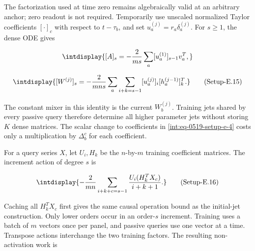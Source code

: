 
The factorization used at time zero remains algebraically valid at an arbitrary anchor; zero readout is not required. Temporarily use unscaled normalized Taylor coefficients \([\cdot]_c\) with respect to \(t-\tau_b\), and set \(u_a^{(j)}=r_a\delta_a^{(j)}\). For \(s\ge1\), the dense ODE gives


\begingroup\renewcommand{\theHequation}{intdisplay.1017}
\begin{equation*}
\intdisplay{
[A]_s=-\frac2{ms}\sum_a[u_a^{(1)}]_{s-1}v_a^T,
}
\end{equation*}
\endgroup

\label{int:eq-setup-e-15}
\begingroup\renewcommand{\theHequation}{intdisplay.1018}
\begin{equation}
\intdisplay{
[W^{(j)}]_s=-\frac2{mns}\sum_a\sum_{i+k=s-1}
              [u_a^{(j)}]_i[h_a^{(j-1)}]_k^T.
}
\tag{Setup-E.15}
\label{int:eq-0530-setup-e-15}
\end{equation}
\endgroup


The constant mixer in this identity is the current \(W_b^{(j)}\). Training jets shared by every passive query therefore determine all higher parameter jets without storing \(K\) dense matrices. The scalar change to coefficients in \hyperref[int:eq-setup-e-4]{\eqref{int:eq-0519-setup-e-4}} costs only a multiplication by \(\Delta_b^c\) for each coefficient.



For a query series \(X\), let \(U_i,\allowbreak H_k\) be the \(n\)-by-\(m\) training coefficient matrices. The increment action of degree \(s\) is


\label{int:eq-setup-e-16}
\begingroup\renewcommand{\theHequation}{intdisplay.1019}
\begin{equation}
\intdisplay{
-\frac2{mn}\sum_{i+k+c=s-1}
                   \frac{U_i(H_k^TX_c)}{i+k+1}.
}
\tag{Setup-E.16}
\label{int:eq-0531-setup-e-16}
\end{equation}
\endgroup


Caching all \(H_k^TX_c\) first gives the same causal operation bound as the initial-jet construction. Only lower orders occur in an order-\(s\) increment. Training uses a batch of \(m\) vectors once per panel, and passive queries use one vector at a time. Transpose actions interchange the two training factors. The resulting non-activation work is


